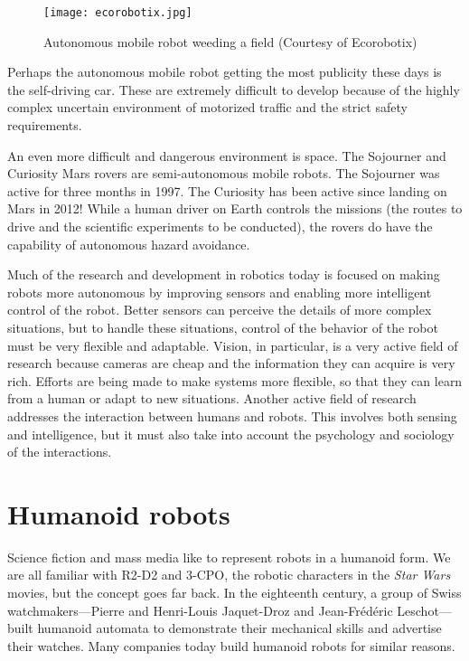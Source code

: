 \begin{figure}
\begin{center}
\texttt{[image: ecorobotix.jpg]}
\end{center}
\caption{Autonomous mobile robot weeding a field (Courtesy of Ecorobotix)}\label{fig.agri_robot}
\end{figure}

Perhaps the autonomous mobile robot getting the most publicity these days is the self-driving car. These are extremely difficult to develop because of the highly complex uncertain environment of motorized traffic and the strict safety requirements.

An even more difficult and dangerous environment is space. The Sojourner and Curiosity Mars rovers are semi-autonomous mobile robots. The Sojourner was active for three months in 1997. The Curiosity has been active since landing on Mars in 2012! While a human driver on Earth controls the missions (the routes to drive and the scientific experiments to be conducted), the rovers do have the capability of autonomous hazard avoidance.

Much of the research and development in robotics today is focused on making robots more autonomous by improving sensors and enabling more intelligent control of the robot. Better sensors can perceive the details of more complex situations, but to handle these situations, control of the behavior of the robot must be very flexible and adaptable. Vision, in particular, is a very active field of research because cameras are cheap and the information they can acquire is very rich. Efforts are being made to make systems more flexible, so that they can learn from a human or adapt to new situations. Another active field of research addresses the interaction between humans and robots. This involves both sensing and intelligence, but it must also take into account the psychology and sociology of the interactions.

\section{Humanoid robots}

Science fiction and mass media like to represent robots in a humanoid form. We are all familiar with R2-D2 and 3-CPO, the robotic characters in the \emph{Star Wars} movies, but the concept goes far back. In the eighteenth century, a group of Swiss watchmakers---Pierre and Henri-Louis Jaquet-Droz and Jean-Fr\'{e}d\'{e}ric Leschot---built humanoid automata to demonstrate their mechanical skills and advertise their watches. Many companies today build humanoid robots for similar reasons.

